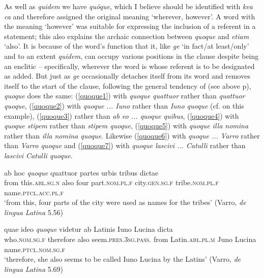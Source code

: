 As well as \emph{quidem} we have \emph{quŏque}, which I believe should be identified with  \emph{kva ca} and therefore assigned the original meaning `wherever, however'. A word with the meaning `however' was suitable for expressing the inclusion of a referent in a statement; this also explains the archaic connection between \emph{quoque} and \emph{etiam} `also'. It is because of the word's function that it, like \emph{ge} `in fact/at least/only' and to an extent \emph{quidem}, can occupy various positions in the clause despite being an enclitic -- specifically, wherever the word is whose referent is to be designated as added. But just as \emph{ge} occasionally detaches itself from its word and removes itself to the start of the clause, following the general tendency of  (see above p\pageref{greekge}), \emph{quoque} does the same: (\ref{quoque1}) with \emph{quoque quattuor} rather than \emph{quattuor quoque}, (\ref{quoque2}) with \emph{quoque ... Iuno} rather than \emph{Iuno quoque} (cf. \citealp{Spengel1886} on this example), (\ref{quoque3}) rather than \emph{ab eo ... quoque quibus}, (\ref{quoque4}) with \emph{quoque stipem} rather than \emph{stipem quoque}, (\ref{quoque5}) with \emph{quoque illa nomina} rather than \emph{illa nomina quoque}. Likewise (\ref{quoque6}) with \emph{quoque ... Varro} rather than \emph{Varro quoque} and (\ref{quoque7}) with \emph{quoque lascivi ... Catulli} rather than \emph{lascivi Catulli quoque}.

\begin{exe}
\ex
\gll ab hoc \emph{quoque} quattuor partes urbis tribus dictae\\
from this.\textsc{abl.sg.n} also four part.\textsc{nom.pl.f} city.\textsc{gen.sg.f} tribe.\textsc{nom.pl.f} name.\textsc{ptcl.acc.pl.f}\\
\trans `from this, four parts of the city were used as names for the tribes' (Varro, \textit{de lingua Latina} 5.56)
\label{quoque1}
\end{exe}

\begin{exe}
\ex
\gll quae ideo \emph{quoque} videtur ab Latinis Iuno Lucina dicta\\
who.\textsc{nom.sg.f} therefore also seem.\textsc{pres.3sg.pass.} from Latin.\textsc{abl.pl.m} Juno Lucina name.\textsc{ptcl.nom.sg.f}\\
\trans `therefore, she also seems to be called Iuno Lucina by the Latins' (Varro, \textit{de lingua Latina} 5.69)
\label{quoque2}
\end{exe}

